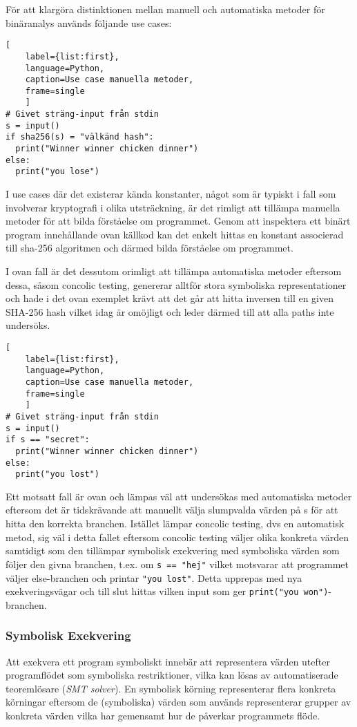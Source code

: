 För att klargöra distinktionen mellan manuell och automatiska metoder för
binäranalys används följande use cases:

\begin{lstlisting}[
    label={list:first},
    language=Python,
    caption=Use case manuella metoder,
    frame=single
    ]
# Givet sträng-input från stdin
s = input()
if sha256(s) = "välkänd hash":
  print("Winner winner chicken dinner")
else:
  print("you lose")

\end{lstlisting}

I use cases där det existerar kända konstanter, något som är typiskt i fall som
involverar kryptografi i olika utsträckning, är det rimligt att tillämpa
manuella metoder för att bilda förståelse om programmet. Genom att inspektera
ett binärt program innehållande ovan källkod kan det enkelt hittas en konstant
associerad till sha-256 algoritmen och därmed bilda förståelse om programmet.

I ovan fall är det dessutom orimligt att tillämpa automatiska metoder eftersom
dessa, såsom concolic testing, genererar alltför stora symboliska
representationer och hade i det ovan exemplet krävt att det går att hitta
inversen till en given SHA-256 hash vilket idag är omöjligt och leder därmed
till att alla paths inte undersöks.

\begin{lstlisting}[
    label={list:first},
    language=Python,
    caption=Use case manuella metoder,
    frame=single
    ]
# Givet sträng-input från stdin
s = input()
if s == "secret":
  print("Winner winner chicken dinner")
else:
  print("you lost")
\end{lstlisting}

Ett motsatt fall är ovan och lämpas väl att undersökas med automatiska
metoder eftersom det är tidskrävande att manuellt välja slumpvalda värden på s
för att hitta den korrekta branchen. Istället lämpar concolic testing, dvs en
automatisk metod, sig väl i detta fallet eftersom concolic testing väljer olika
konkreta värden samtidigt som den tillämpar symbolisk exekvering med symboliska
värden som följer den givna branchen, t.ex. om \lstinline{s == "hej"} vilket
motsvarar att programmet väljer else-branchen och printar \lstinline{"you lost"}. 
Detta upprepas med nya exekveringsvägar och till slut hittas vilken input som ger
\lstinline{print("you won")}-branchen. 

\subsubsection{Symbolisk Exekvering}
Att exekvera ett program symboliskt innebär att representera värden utefter 
programflödet som symboliska restriktioner, vilka kan lösas av automatiserade 
teoremlösare (\emph{SMT solver}). En symbolisk körning representerar flera konkreta 
körningar eftersom de (symboliska) värden som används representerar grupper av 
konkreta värden vilka har gemensamt hur de påverkar programmets flöde. 

